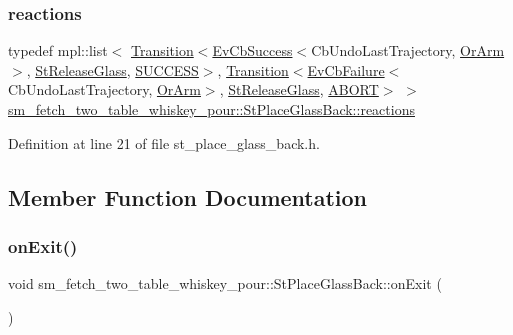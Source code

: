 \subsubsection{\texorpdfstring{reactions}{reactions}}
{\footnotesize\ttfamily typedef mpl\+::list$<$ \hyperlink{classsmacc_1_1Transition}{Transition}$<$\hyperlink{structsmacc_1_1EvCbSuccess}{Ev\+Cb\+Success}$<$Cb\+Undo\+Last\+Trajectory, \hyperlink{classsm__fetch__two__table__whiskey__pour_1_1OrArm}{Or\+Arm}$>$, \hyperlink{structsm__fetch__two__table__whiskey__pour_1_1StReleaseGlass}{St\+Release\+Glass}, \hyperlink{structsmacc_1_1default__transition__tags_1_1SUCCESS}{S\+U\+C\+C\+E\+SS}$>$, \hyperlink{classsmacc_1_1Transition}{Transition}$<$\hyperlink{structsmacc_1_1EvCbFailure}{Ev\+Cb\+Failure}$<$Cb\+Undo\+Last\+Trajectory, \hyperlink{classsm__fetch__two__table__whiskey__pour_1_1OrArm}{Or\+Arm}$>$, \hyperlink{structsm__fetch__two__table__whiskey__pour_1_1StReleaseGlass}{St\+Release\+Glass}, \hyperlink{structsmacc_1_1default__transition__tags_1_1ABORT}{A\+B\+O\+RT}$>$ $>$ \hyperlink{structsm__fetch__two__table__whiskey__pour_1_1StPlaceGlassBack_a213af1569b47b18d2a7c531a2de73375}{sm\+\_\+fetch\+\_\+two\+\_\+table\+\_\+whiskey\+\_\+pour\+::\+St\+Place\+Glass\+Back\+::reactions}}



Definition at line 21 of file st\+\_\+place\+\_\+glass\+\_\+back.\+h.



\subsection{Member Function Documentation}
\mbox{\label{structsm__fetch__two__table__whiskey__pour_1_1StPlaceGlassBack_a3099df2f411da5ec5d92f98f41fdaa5f}} 
\subsubsection{\texorpdfstring{on\+Exit()}{onExit()}}
{\footnotesize\ttfamily void sm\+\_\+fetch\+\_\+two\+\_\+table\+\_\+whiskey\+\_\+pour\+::\+St\+Place\+Glass\+Back\+::on\+Exit (\begin{DoxyParamCaption}{ }\end{DoxyParamCaption})\hspace{0.3cm}{\ttfamily [inline]}}



